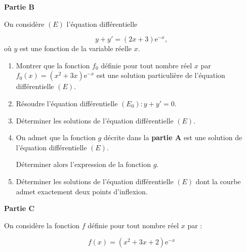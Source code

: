 \documentclass[10pt]{article}
\providecommand{\e}{{\mathrm{e}}}
\begin{document}
\medskip

\textbf{Partie B}

\medskip

On considère $(E)$ l'équation différentielle 

\[y+y'=(2x + 3) \e^{-x},\]
où $y$ est une fonction de la variable réelle $x$.

\medskip

\begin{enumerate}
\item Montrer que la fonction $f_{0}$ définie pour tout nombre réel $x$ par $f_{0}(x)=\left(x^{2}+3 x\right) \e^{-x}$ est une solution particulière de l'équation différentielle $(E)$.
\item Résoudre l'équation différentielle $\left(E_{0}\right): y+ y'= 0$.
\item Déterminer les solutions de l'équation différentielle $(E)$.
\item On admet que la fonction $g$ décrite dans la \textbf{partie A} est une solution de l'équation différentielle $(E)$.

Déterminer alors l'expression de la fonction $g$.
\item Déterminer les solutions de l'équation différentielle $(E)$ dont la courbe admet exactement deux points d'inflexion.
\end{enumerate}

\medskip

\textbf{Partie C}

\medskip

On considère la fonction $f$ définie pour tout nombre réel $x$ par :

\[f(x)=\left(x^{2}+3 x+2\right) \e^{-x}\]
\end{document}
